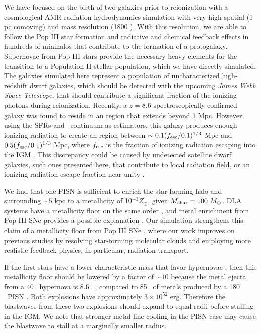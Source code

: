\documentclass[apj]{emulateapj}
\begin{document}
We have focused on the birth of two galaxies prior to reionization
with a cosmological AMR radiation hydrodynamics simulation with very
high spatial (1 pc comoving) and mass resolution (1800 \Ms).  With
this resolution, we are able to follow the Pop III star formation and
radiative and chemical feedback effects in hundreds of minihalos that
contribute to the formation of a protogalaxy.  Supernovae from Pop III
stars provide the necessary heavy elements for the transition to a
Population II stellar population, which we have directly simulated.
The galaxies simulated here represent a population of uncharacterized
high-redshift dwarf galaxies, which should be detected with the
upcoming \textit{James Webb Space Telescope}, that should contribute a
significant fraction of the ionizing photons during reionization.
Recently, a $z=8.6$ spectroscopically confirmed galaxy was found to
reside in an  region that extends beyond 1 Mpc.  However,
using the SFRs and \lya~continuum as estimators, this galaxy produces
enough ionizing radiation to create an  region between $\sim
0.1(f_{\rm esc}/0.1)^{1/3}$ Mpc and $0.5(f_{\rm esc}/0.1)^{1/3}$ Mpc,
where $f_{\rm esc}$ is the fraction of ionizing radiation escaping
into the IGM \citep{Lehnert10_z8.6}.  This discrepancy could be caused
by undetected satellite dwarf galaxies, such ones presented here, that
contribute to local radiation field, or an ionizing radiation escape
fraction near unity \citep{Wise09, Razoumov10, Paardekooper11,
  Yajima11}.

We find that one PISN is sufficient to enrich the star-forming halo
and surrounding $\sim 5$ kpc to a metallicity of 10$^{-3} Z_\odot$,
given $M_{\rm char} = 100~\Ms$.  DLA systems have a metallicity floor
on the same order \citep{Wolfe05_Review, Penprase10}, and metal
enrichment from Pop III SNe provides a possible explanation
\citep{Kobayashi11}.  Our simulation strengthens this claim of a
metallicity floor from Pop III SNe \citep[see also][]{Tornatore07,
  Karlsson08, Maio11_Enrich}, where our work improves on previous
studies by resolving star-forming molecular clouds and employing more
realistic feedback physics, in particular, radiation transport.

If the first stars have a lower characteristic mass that favor
hypernovae \citep{Tumlinson07_IMF}, then this metallicity floor should
be lowered by a factor of $\sim 10$ because the metal ejecta from a 40
\Ms~hypernova is 8.6 \Ms~\citep{Nomoto06}, compared to 85 \Ms~of
metals produced by a 180 \Ms~PISN \citep{Heger02}.  Both explosions
have approximately $3 \times 10^{52}$ erg.  Therefore the blastwaves
from these two explosions should expand to equal radii before stalling
in the IGM.  We note that stronger metal-line cooling in the PISN case
may cause the blastwave to stall at a marginally smaller radius.  
\end{document}
